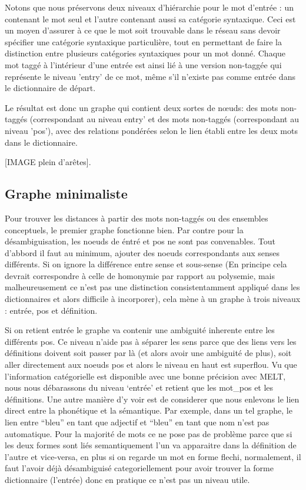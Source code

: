 Notons que nous préservons deux niveaux d'hiérarchie pour le mot d'entrée : un 
contenant le mot seul et l'autre contenant aussi sa catégorie syntaxique. Ceci 
est un moyen d'assurer à ce que le mot soit trouvable dans le réseau sans devoir 
spécifier une catégorie syntaxique particulière, tout en permettant de faire la 
distinction entre plusieurs catégories syntaxiques pour un mot donné. Chaque mot 
taggé à l'intérieur d'une entrée est ainsi lié à une version non-taggée qui 
représente le niveau 'entry' de ce mot, même s'il n'existe pas comme entrée dans 
le dictionnaire de départ.

Le résultat est donc un graphe qui contient deux sortes de nœuds: des mots non-taggés 
(correspondant au niveau entry' et des mots non-taggés (correspondant au niveau 
'pos'), avec des relations pondérées selon le lien établi entre les deux mots dans le dictionnaire.

[IMAGE plein d'arêtes].

\subsection{Graphe minimaliste}

Pour trouver les distances à partir des mots non-taggés ou des ensembles
conceptuels, le premier graphe fonctionne bien. Par contre pour
la désambiguisation, les noeuds de éntré et pos ne sont pas convenables.
Tout d'abbord il faut au minimum, ajouter des noeuds correspondants aux senses
différents. Si on ignore la différence entre sense et sous-sense (En principe
cela devrait correspondre à celle de homonymie par rapport au polysemie,
mais malheureusement ce n'est pas une distinction consistentamment appliqué
 dans les dictionnaires et alors difficile à incorporer), cela mène à un
graphe à trois niveaux : entrée, pos et définition.

Si on retient entrée le graphe va contenir une ambiguité inherente
entre les différents pos. Ce niveau n'aide pas à séparer les
sens parce que des liens vers les définitions doivent soit passer par
là (et alors avoir une ambiguité de plus), soit aller directement aux noeuds
pos et alors le niveau en haut est superflou. Vu que l'information
catégorielle est disponible avec une bonne précision avec MELT, nous nous
débarassons du niveau `entrée' et retient que les mot\_pos et les définitions.
Une autre manière d'y voir est de considerer que nous enlevons le lien direct
entre la phonétique et la sémantique. Par exemple, dans un tel graphe,
 le lien entre ``bleu''
en tant que adjectif et ``bleu'' en tant que nom n'est pas automatique.
Pour la majorité de mots ce ne pose pas de problème parce que si les deux
formes sont liés semantiquement l'un va apparaitre dans la définition
de l'autre et vice-versa, en plus si on regarde un mot en forme flechi,
normalement, il
faut l'avoir déjà désambiguisé categoriellement pour avoir trouver la forme
dictionnaire (l'entrée) donc en pratique ce n'est pas un niveau utile.

